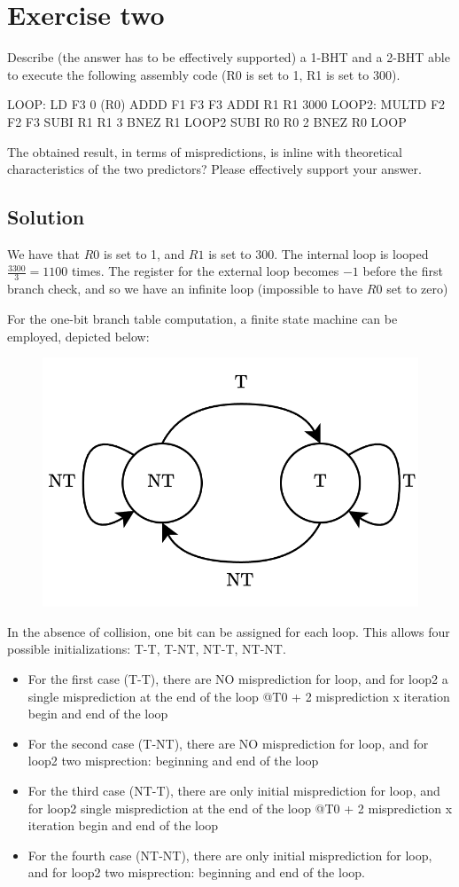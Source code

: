 \section{Exercise two}

Describe (the answer has to be effectively supported) a 1-BHT and a 2-BHT able to execute the following assembly code (R0 is set to 1, R1 is set to 300). 
\begin{verbnobox}[\verbarg]
LOOP:   LD F3 0 (R0)
        ADDD F1 F3 F3
        ADDI R1 R1 3000
LOOP2:  MULTD F2 F2 F3
        SUBI R1 R1 3
        BNEZ R1 LOOP2
        SUBI R0 R0 2
        BNEZ R0 LOOP
\end{verbnobox}
The obtained result, in terms of mispredictions, is inline with theoretical characteristics of the two predictors? 
Please effectively support your answer.

\subsection*{Solution}
We have that $R0$ is set to 1, and $R1$ is set to 300. 
The internal loop is looped $\frac{3300}{3}=1100$ times. 
The register for the external loop becomes $-1$ before the first branch check, and so we have an infinite loop (impossible to have $R0$ set to zero)

For the one-bit branch table computation, a finite state machine can be employed, depicted below:
\begin{figure}[H]
    \centering
    \includegraphics[width=0.4\linewidth]{images/1bht.png}
\end{figure}

In the absence of collision, one bit can be assigned for each loop. 
This allows four possible initializations: T-T, T-NT, NT-T, NT-NT.
\begin{itemize}
    \item For the first case (T-T), there are NO misprediction for loop, and for loop2 a single misprediction at the end of the loop @T0 + 2 misprediction x iteration begin and end of the loop
    \item For the second case (T-NT), there are NO misprediction for loop, and for loop2 two misprection: beginning and end of the loop
    \item For the third case (NT-T), there are only initial misprediction for loop, and for loop2 single misprediction at the end of the loop @T0 + 2 misprediction x iteration begin and end of the loop
    \item For the fourth case (NT-NT), there are only initial misprediction for loop, and for loop2 two misprection: beginning and end of the loop. 
\end{itemize}

